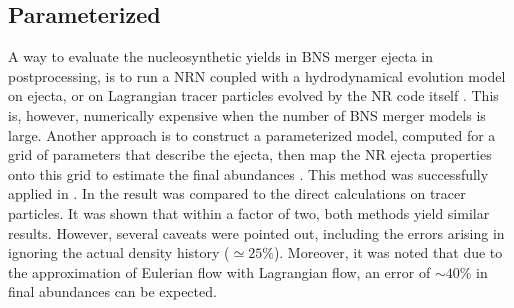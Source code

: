 \subsection{Parameterized \nuc{}}
A way to evaluate the nucleosynthetic yields in \ac{BNS} merger ejecta 
in postprocessing, is to run a \ac{NRN} coupled with a hydrodynamical 
evolution model on ejecta, or on Lagrangian tracer particles 
evolved by the \ac{NR} code itself 
\citep[\eg][]{Goriely:2011vg,Korobkin:2012uy,Grossman:2013lqa,Wanajo:2014wha,Just:2014fka,Martin:2015hxa}.
This is, however, numerically expensive when the number of \ac{BNS} 
merger models is large. 
%
Another approach is to construct a parameterized \nuc{} model, 
computed for a grid of parameters that describe the ejecta, 
then map the \ac{NR} ejecta properties onto this grid to estimate the 
final abundances \citep{Lippuner:2015gwa}. 
%
This method was successfully applied in \citet{Radice:2016dwd,Radice:2018pdn}.
In \citet{Radice:2018pdn} the result was compared to the direct \nuc{} 
calculations on tracer particles. 
It was shown that within a factor of two, both methods yield similar results. 
However, several caveats were pointed out, including the errors arising in 
ignoring the actual density history (${\simeq}25\%$). Moreover, it was 
noted that due to the approximation of Eulerian flow with Lagrangian flow, 
an error of ${\sim}40\%$ in final abundances can be expected.

